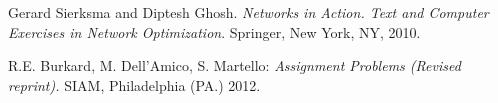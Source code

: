 \begin{thebibliography}{9}

Gerard Sierksma and Diptesh Ghosh.
\emph{Networks in Action. Text and Computer Exercises in Network Optimization}.
Springer, New York, NY, 2010.

R.E. Burkard, M. Dell'Amico, S. Martello:
\emph{Assignment Problems (Revised reprint).}
SIAM, Philadelphia (PA.) 2012.

\end{thebibliography}
